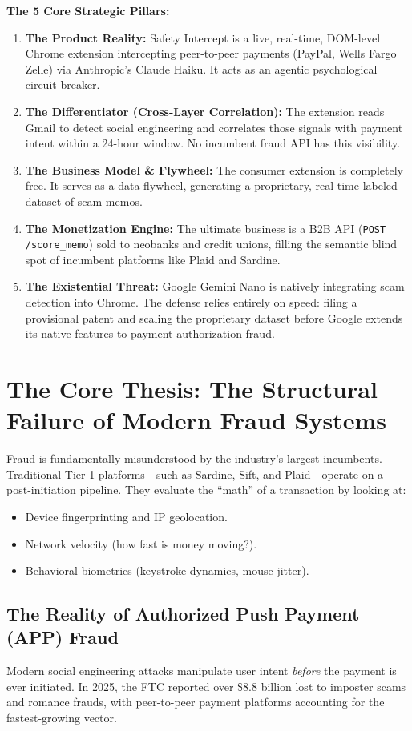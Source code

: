 \documentclass[12pt, letterpaper]{article}
\begin{document}
\textbf{The 5 Core Strategic Pillars:}
\begin{enumerate}[leftmargin=*]
    \item \textbf{The Product Reality:} Safety Intercept is a live, real-time, DOM-level Chrome extension intercepting peer-to-peer payments (PayPal, Wells Fargo Zelle) via Anthropic's Claude Haiku. It acts as an agentic psychological circuit breaker.
    \item \textbf{The Differentiator (Cross-Layer Correlation):} The extension reads Gmail to detect social engineering and correlates those signals with payment intent within a 24-hour window. No incumbent fraud API has this visibility.
    \item \textbf{The Business Model \& Flywheel:} The consumer extension is completely free. It serves as a data flywheel, generating a proprietary, real-time labeled dataset of scam memos. 
    \item \textbf{The Monetization Engine:} The ultimate business is a B2B API (\texttt{POST /score\_memo}) sold to neobanks and credit unions, filling the semantic blind spot of incumbent platforms like Plaid and Sardine.
    \item \textbf{The Existential Threat:} Google Gemini Nano is natively integrating scam detection into Chrome. The defense relies entirely on speed: filing a provisional patent and scaling the proprietary dataset before Google extends its native features to payment-authorization fraud.
\end{enumerate}

\newpage
\section{The Core Thesis: The Structural Failure of Modern Fraud Systems}

Fraud is fundamentally misunderstood by the industry's largest incumbents. Traditional Tier 1 platforms—such as Sardine, Sift, and Plaid—operate on a post-initiation pipeline. They evaluate the ``math'' of a transaction by looking at:
\begin{itemize}
    \item Device fingerprinting and IP geolocation.
    \item Network velocity (how fast is money moving?).
    \item Behavioral biometrics (keystroke dynamics, mouse jitter).
\end{itemize}

\subsection{The Reality of Authorized Push Payment (APP) Fraud}
Modern social engineering attacks manipulate user intent \textit{before} the payment is ever initiated. In 2025, the FTC reported over \$8.8 billion lost to imposter scams and romance frauds, with peer-to-peer payment platforms accounting for the fastest-growing vector.
\end{document}
